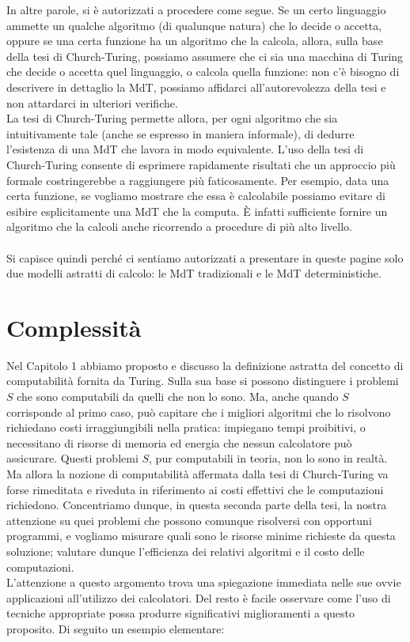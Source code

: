 \documentclass[12pt,a4paper]{report}
\theoremstyle{definition}
\begin{document}
In altre parole, si è autorizzati a procedere come segue. Se un certo linguaggio ammette un qualche algoritmo (di qualunque natura) che lo decide o accetta, oppure se una certa funzione ha un algoritmo che la calcola, allora, sulla base della tesi di Church-Turing, possiamo assumere che ci sia una macchina di Turing che decide o accetta quel linguaggio, o calcola quella funzione: non c'è bisogno di descrivere in dettaglio la MdT, possiamo affidarci all'autorevolezza della tesi e non attardarci in ulteriori verifiche.\\
La tesi di Church-Turing permette allora, per ogni algoritmo che sia intuitivamente tale (anche se espresso in maniera informale), di dedurre l'esistenza di una MdT che lavora in modo equivalente. L'uso della tesi di Church-Turing consente di esprimere rapidamente risultati che un approccio più formale costringerebbe a raggiungere più faticosamente. Per esempio, data una certa funzione, se vogliamo mostrare che essa è calcolabile possiamo evitare di esibire esplicitamente una MdT che la computa. È infatti sufficiente fornire un algoritmo che la calcoli anche ricorrendo a procedure di più alto livello.\\
\\
Si capisce quindi perché ci sentiamo autorizzati a presentare in queste pagine solo due modelli astratti di calcolo: le MdT tradizionali e le MdT deterministiche.



\chapter{Complessità}


Nel Capitolo 1 abbiamo proposto e discusso la definizione astratta del concetto di computabilità fornita da Turing. Sulla sua base si possono distinguere i problemi $S$ che sono computabili da quelli che non lo sono. Ma, anche quando $S$ corrisponde al primo caso, può capitare che i migliori algoritmi che lo risolvono richiedano costi irraggiungibili nella pratica: impiegano tempi proibitivi, o necessitano di risorse di memoria ed energia che nessun calcolatore può assicurare. Questi problemi $S$, pur computabili in teoria, non lo sono in realtà. Ma allora la nozione di computabilità affermata dalla tesi di Church-Turing va forse rimeditata e riveduta in riferimento ai costi effettivi che le computazioni richiedono. Concentriamo dunque, in questa seconda parte della tesi, la nostra attenzione su quei problemi che possono comunque risolversi con opportuni programmi, e vogliamo misurare quali sono le risorse minime richieste da questa soluzione; valutare dunque l'efficienza dei relativi algoritmi e il costo delle computazioni.\\
L'attenzione a questo argomento trova una spiegazione immediata nelle sue ovvie applicazioni all'utilizzo dei calcolatori. Del resto è facile osservare come l'uso di tecniche appropriate possa produrre significativi miglioramenti a questo proposito. Di seguito un esempio elementare:
\end{document}
